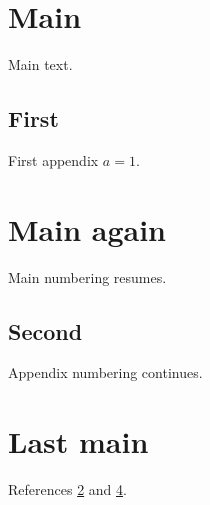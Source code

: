 \documentclass{article}
\begin{document}
\section{Main}Main text.
\begin{appendices}
\appendixpage
\section{First}\label{app:first}First appendix $a=1$.
\end{appendices}
\section{Main again}Main numbering resumes.
\begin{appendices}
\section{Second}\label{app:second}Appendix numbering continues.
\end{appendices}
\section{Last main}References \ref{app:first} and \ref{app:second}.
\end{document}
